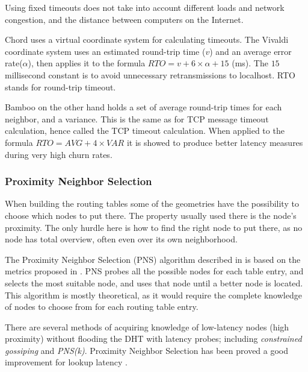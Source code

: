Using fixed timeouts does not take into account different loads and network congestion,
 and the distance between computers on the Internet.

Chord uses a virtual coordinate system for calculating timeouts\cite{rhea-04-handling-churn}.
 The Vivaldi coordinate system uses an estimated round-trip time ($v$) and an average error
 rate($\alpha$), then applies it to the formula $ RTO = v + 6\times\alpha + 15 $ (ms). The $15$
 millisecond constant is to avoid unnecessary retransmissions to localhost. RTO stands for
 round-trip timeout.

Bamboo on the other hand holds a set of average round-trip times for each neighbor, and a
 variance. This is the same as for TCP message timeout calculation, hence called the TCP
 timeout calculation. When applied to the formula $RTO = AVG + 4\times{}VAR$ it is showed
 to produce better latency measures during very high churn rates\cite{rhea-04-handling-churn}.

\subsubsection{Proximity Neighbor Selection}
\label{theory:Routing:Proximity-Neighbors}

When building the routing tables some of the geometries have the possibility to choose
 which nodes to put
 there\cite{gummadi-03-impact-geometry,zhao-02-locality-aware,castro-03-proximity}.
 The property usually used there is the node's proximity. The only hurdle here is how
 to find the right node to put there, as no node has total overview, often even over its own
 neighborhood.

The  Proximity Neighbor Selection (PNS) algorithm described in
 \cite{castro-03-proximity} is based on the metrics proposed in
 \cite{plaxton-97-accessing-nearby}. PNS probes all the possible nodes for each
 table entry, and selects the most suitable node, and uses that node until a
 better node is located. This algorithm is mostly theoretical, as it would
 require the complete knowledge of nodes to choose from for each routing table entry.

There are several methods of acquiring knowledge of low-latency nodes (high proximity)
 without flooding the DHT with latency probes; including
 \emph{constrained gossiping}\cite{castro-03-proximity} and
 \emph{PNS(k)}\cite{gummadi-03-impact-geometry}. Proximity Neighbor Selection has
 been proved a good improvement for lookup latency
 \cite{chun-05-impact,rhea-04-handling-churn,dabek-04-designing,castro-03-proximity}.

